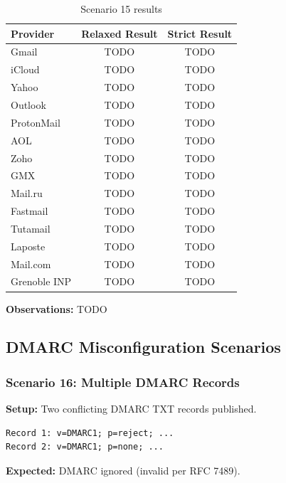 \documentclass[11pt,a4paper]{article}
\begin{document}
\begin{table}[h]
\centering
\small
\begin{tabular}{lcc}
\toprule
\textbf{Provider} & \textbf{Relaxed Result} & \textbf{Strict Result} \\
\midrule
Gmail & TODO & TODO \\
iCloud & TODO & TODO \\
Yahoo & TODO & TODO \\
Outlook & TODO & TODO \\
ProtonMail & TODO & TODO \\
AOL & TODO & TODO \\
Zoho & TODO & TODO \\
GMX & TODO & TODO \\
Mail.ru & TODO & TODO \\
Fastmail & TODO & TODO \\
Tutamail & TODO & TODO \\
Laposte & TODO & TODO \\
Mail.com & TODO & TODO \\
Grenoble INP & TODO & TODO \\
\bottomrule
\end{tabular}
\caption{Scenario 15 results}
\end{table}

\textbf{Observations:} TODO

\subsection{DMARC Misconfiguration Scenarios}

\subsubsection{Scenario 16: Multiple DMARC Records}

\textbf{Setup:} Two conflicting DMARC TXT records published.

\begin{lstlisting}
Record 1: v=DMARC1; p=reject; ...
Record 2: v=DMARC1; p=none; ...
\end{lstlisting}

\textbf{Expected:} DMARC ignored (invalid per RFC 7489).
\end{document}
